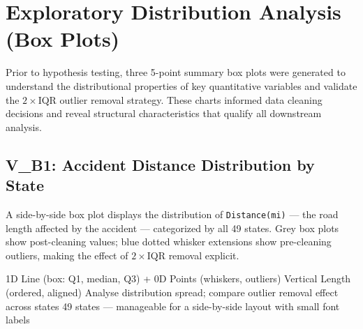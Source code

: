 
\section{Exploratory Distribution Analysis (Box Plots)}

Prior to hypothesis testing, three 5-point summary box plots were generated to
understand the distributional properties of key quantitative variables and
validate the $2\times$IQR outlier removal strategy. These charts informed data
cleaning decisions and reveal structural characteristics that qualify all
downstream analysis.

\subsection{V\_B1: Accident Distance Distribution by State}

A side-by-side box plot displays the distribution of \texttt{Distance(mi)} ---
the road length affected by the accident --- categorized by all 49 states.
Grey box plots show post-cleaning values; blue dotted whisker extensions show
pre-cleaning outliers, making the effect of $2\times$IQR removal explicit.

\begin{figure}[H]
  \centering
  \caption{}
  \label{fig:vb1}
\end{figure}

\idiomtable
  {1D Line (box: Q1, median, Q3) + 0D Points (whiskers, outliers)}
  {Vertical Length (ordered, aligned)}
  {Analyse distribution spread; compare outlier removal effect across states}
  {49 states --- manageable for a side-by-side layout with small font labels}



